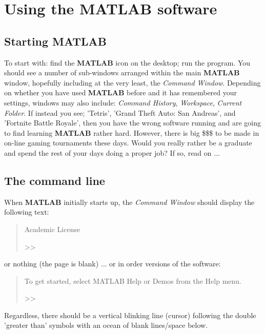 \documentclass{tufte-book} %
\newenvironment{docspec}{\begin{quotation}\ttfamily\parskip0pt\parindent0pt\ignorespaces}{\end{quotation}}
\begin{document}
\section{Using the MATLAB software}


\subsection{Starting MATLAB}

To start with: find the \textbf{MATLAB} icon on the desktop; run the program. You should see a number of sub-windows arranged within the main \textbf{MATLAB} window, hopefully including at the very least, the \textit{Command Window}. Depending on whether you have used \textbf{MATLAB} before and it has remembered your settings, windows may also include: \textit{Command History}, \textit{Workspace}, \textit{Current Folder}. If instead you see; 'Tetris', 'Grand Theft Auto: San Andreas', and 'Fortnite Battle Royale', then you have the wrong software running and are going to find learning \textbf{MATLAB} rather hard. However, there is big \$\$\$ to be made in on-line gaming tournaments these days. Would you really rather be a graduate and spend the rest of your days doing a proper job?
If so, read on ...
\subsection{The command line}

When \textbf{MATLAB} initially starts up, the \textit{Command Window} should display the following text: 

\begin{docspec}
        Academic License

>>
\end{docspec}

\noindent or nothing (the page is blank) ... or in order versions of the software:

\begin{docspec}
To get started, select MATLAB Help or Demos from the Help menu.

>>
\end{docspec}

\noindent Regardless, there should be a vertical blinking line (cursor) following the double 'greater than' symbols with an ocean of blank lines/space below.
\end{document}
